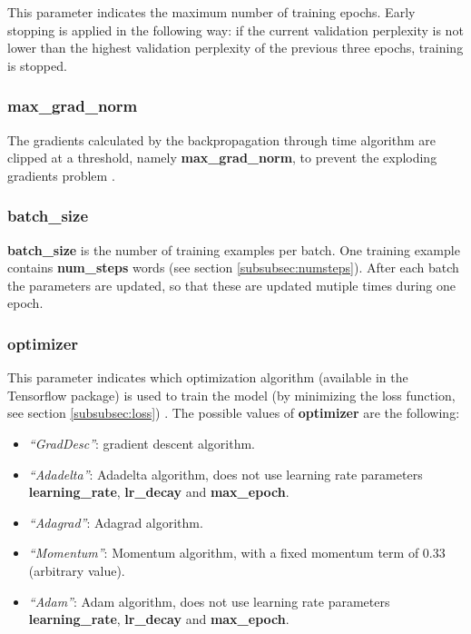 \documentclass[10pt,a4paper,titlepage]{article}
\begin{document}
This parameter indicates the maximum number of training epochs. Early stopping is applied in the following way: if the current validation perplexity is not lower than the highest validation perplexity of the previous three epochs, training is stopped.

\subsubsection{max\_grad\_norm}

The gradients calculated by the backpropagation through time algorithm are clipped at a threshold, namely \textbf{max\_grad\_norm}, to prevent the exploding gradients problem \cite{bptt,exp}.

\subsubsection{batch\_size}

\textbf{batch\_size} is the number of training examples per batch. One training example contains \textbf{num\_steps} words (see section \ref{subsubsec:numsteps}). After each batch the parameters are updated, so that these are updated mutiple times during one epoch.

\subsubsection{optimizer}
\label{subsubsec:opt}

This parameter indicates which optimization algorithm (available in the Tensorflow package) is used to train the model (by minimizing the loss function, see section \ref{subsubsec:loss}) \cite{opt}. The possible values of \textbf{optimizer} are the following:

\begin{itemize}

	\item \textit{``GradDesc''}: gradient descent algorithm.
	\item \textit{``Adadelta''}: Adadelta algorithm, does not use learning rate parameters \textbf{learning\_rate}, \textbf{lr\_decay} and \textbf{max\_epoch}.
	\item \textit{``Adagrad''}: Adagrad algorithm.
	\item \textit{``Momentum''}: Momentum algorithm, with a fixed momentum term of 0.33 (arbitrary value).
	\item \textit{``Adam''}: Adam algorithm, does not use learning rate parameters \textbf{learning\_rate}, \textbf{lr\_decay} and \textbf{max\_epoch}.	

\end{itemize}
\end{document}
